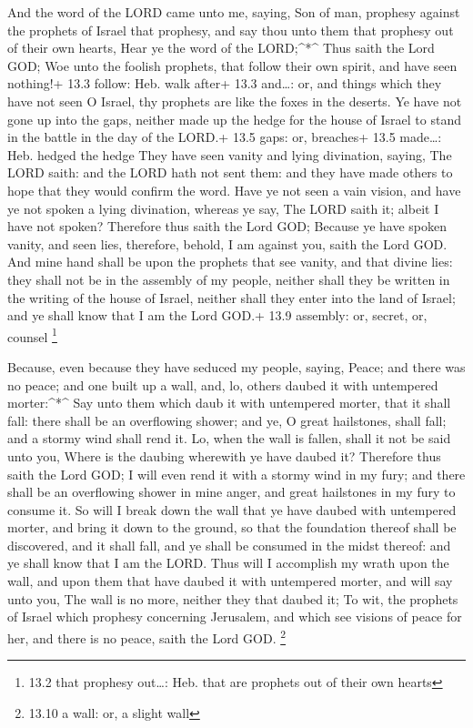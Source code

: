  And the word of the LORD came unto me, saying, 
Son of man, prophesy against the prophets of Israel that prophesy, and
say thou unto them that prophesy out of their own hearts, Hear ye the
word of the LORD;\^{}*\^{}  Thus saith the Lord GOD; Woe
unto the foolish prophets, that follow their own spirit, and have seen
nothing!+ 13.3 follow: Heb. walk after+ 13.3 and\ldots: or, and things
which they have not seen  O Israel, thy prophets are like
the foxes in the deserts.  Ye have not gone up into the
gaps, neither made up the hedge for the house of Israel to stand in the
battle in the day of the LORD.+ 13.5 gaps: or, breaches+ 13.5
made\ldots: Heb. hedged the hedge  They have seen vanity and
lying divination, saying, The LORD saith: and the LORD hath not sent
them: and they have made others to hope that they would confirm the
word.  Have ye not seen a vain vision, and have ye not
spoken a lying divination, whereas ye say, The LORD saith it; albeit I
have not spoken?  Therefore thus saith the Lord GOD; Because
ye have spoken vanity, and seen lies, therefore, behold, I am against
you, saith the Lord GOD.  And mine hand shall be upon the
prophets that see vanity, and that divine lies: they shall not be in the
assembly of my people, neither shall they be written in the writing of
the house of Israel, neither shall they enter into the land of Israel;
and ye shall know that I am the Lord GOD.+ 13.9 assembly: or, secret,
or, counsel \footnote{13.2 that prophesy out\ldots: Heb. that are
  prophets out of their own hearts}

 Because, even because they have seduced my people, saying,
Peace; and there was no peace; and one built up a wall, and, lo, others
daubed it with untempered morter:\^{}*\^{}  Say unto them
which daub it with untempered morter, that it shall fall: there shall be
an overflowing shower; and ye, O great hailstones, shall fall; and a
stormy wind shall rend it.  Lo, when the wall is fallen,
shall it not be said unto you, Where is the daubing wherewith ye have
daubed it?  Therefore thus saith the Lord GOD; I will even
rend it with a stormy wind in my fury; and there shall be an overflowing
shower in mine anger, and great hailstones in my fury to consume it.
 So will I break down the wall that ye have daubed with
untempered morter, and bring it down to the ground, so that the
foundation thereof shall be discovered, and it shall fall, and ye shall
be consumed in the midst thereof: and ye shall know that I am the LORD.
 Thus will I accomplish my wrath upon the wall, and upon
them that have daubed it with untempered morter, and will say unto you,
The wall is no more, neither they that daubed it;  To wit,
the prophets of Israel which prophesy concerning Jerusalem, and which
see visions of peace for her, and there is no peace, saith the Lord GOD.
\footnote{13.10 a wall: or, a slight wall}

